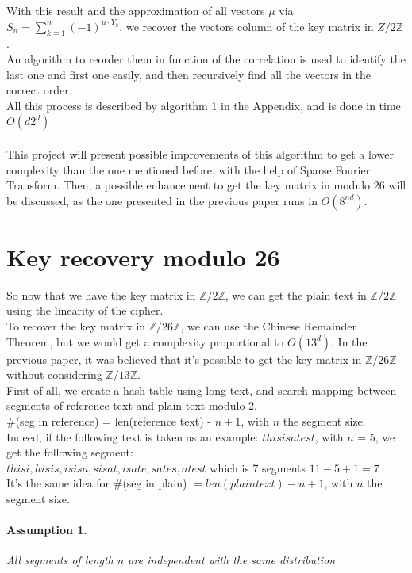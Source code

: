 \documentclass{article}
\begin{document}
With this result and the approximation of all vectors $\mu$ via $S_n = \sum_{k=1}^{n}{(-1)^{\mu \cdot Y_{k}}}$, we recover the vectors column of the key matrix in ${Z}/2\mathbb{Z}$.\\
An algorithm to reorder them in function of the correlation is used to identify the last one and first one easily, and then recursively find all the vectors in the correct order.\\
All this process is described by algorithm 1 in the Appendix, and is done in time $O(d 2^d)$\\
\\
This project will present possible improvements of this algorithm to get a lower complexity than the one mentioned before, with the help of Sparse Fourier Transform. Then, a possible enhancement to get the key matrix in modulo 26 will be discussed, as the one presented in the previous paper runs in $O(8^{nd})$.\\


\section{Key recovery modulo 26}
So now that we have the key matrix in $\mathbb{Z}/2\mathbb{Z}$, we can get the plain text in $\mathbb{Z}/2\mathbb{Z}$ using the linearity of the cipher.\\
To recover the key matrix in $\mathbb{Z}/26\mathbb{Z}$, we can use the Chinese Remainder Theorem, but we would get a complexity proportional to $O(13^d)$. In the previous paper, it was believed that it's possible to get the key matrix in $\mathbb{Z}/26\mathbb{Z}$ without considering $\mathbb{Z}/13\mathbb{Z}$.\\
First of all, we create a hash table using long text, and search mapping between segments of reference text and plain text modulo 2.\\
\#(seg in reference) = len(reference text) - $n +1$, with $n$ the segment size.\\
Indeed, if the following text is taken as an example: $thisisatest$, with $n$ = 5, we get the following segment:\\
 $ thisi, hisis, isisa, sisat, isate, sates, atest $ which is 7 segments $ 11 - 5 + 1 = 7 $\\
It's the same idea for \#(seg in plain) $= len(plain text) - n +1$, with $n$ the segment size.\\
\paragraph{Assumption 1.}\textit{All segments of length $n$ are independent with the same distribution}
\end{document}
